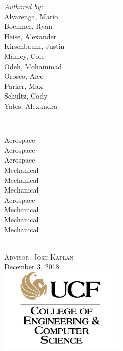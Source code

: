 \begin{titlepage}
{\begin{minipage}{0.3\textwidth}
\begin{flushleft} \large
\emph{Authored by:} \\ 
Alvarenga, Mario \\
Boehmer, Ryan \\
Heise, Alexander \\
Kirschbaum, Justin  \\
Manley, Cole \\
Odeh, Mohammad \\
Orosco, Alec \\
Parker, Max \\
Schultz, Cody \\
Yates, Alexandra \\
\end{flushleft}
\end{minipage}
~ 
\begin{minipage}{0.4\textwidth}
\begin{flushright} \large
\hfill
Aerospace \\
Aerospace \\
Aerospace \\
Mechanical \\
Mechanical \\
Mechanical \\
Aerospace \\
Mechanical \\
Mechanical \\
Mechanical \\
\end{flushright}
\end{minipage}\\[0.75cm]

\textsc{\large Advisor: Josh Kaplan}\\[0.5cm]

{\large December 3, 2018}\\[1cm] %

\includegraphics[width=0.45\textwidth]{UCF_logo.png} %
 
}
\end{titlepage}

